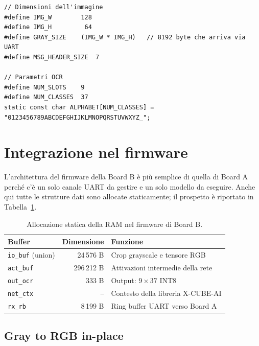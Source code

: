 \begin{lstlisting}[style=stileC, caption={Alfabeto del modello OCR.}, label={lst:alphabet}]
// Dimensioni dell'immagine
#define IMG_W        128
#define IMG_H         64
#define GRAY_SIZE    (IMG_W * IMG_H)   // 8192 byte che arriva via UART
#define MSG_HEADER_SIZE  7

// Parametri OCR
#define NUM_SLOTS    9     
#define NUM_CLASSES  37   
static const char ALPHABET[NUM_CLASSES] = "0123456789ABCDEFGHIJKLMNOPQRSTUVWXYZ_";
\end{lstlisting}

\section{Integrazione nel firmware}
\label{sec:firmware-B}

L'architettura del firmware della Board B è più semplice di quella di Board A perché c'è un solo canale UART da gestire e un solo modello da eseguire. Anche qui tutte le strutture dati sono allocate staticamente; il prospetto è riportato in Tabella~\ref{tab:buffer-B}.

\begin{table}[H]
    \centering
    \caption{Allocazione statica della RAM nel firmware di Board B.}
    \label{tab:buffer-B}
    \begin{tabular}{lrl}
        \toprule
        \textbf{Buffer} & \textbf{Dimensione} & \textbf{Funzione} \\
        \midrule
        \texttt{io\_buf} (union)   & 24\,576 B   & Crop grayscale e tensore RGB \\
        \texttt{act\_buf}          & 296\,212 B  & Attivazioni intermedie della rete \\
        \texttt{out\_ocr}          & 333 B       & Output: $9 \times 37$ INT8 \\
        \texttt{net\_ctx}          & --          & Contesto della libreria X-CUBE-AI \\
        \texttt{rx\_rb}            & 8\,199 B    & Ring buffer UART verso Board A \\
        \bottomrule
    \end{tabular}
\end{table}

\subsection{Gray to RGB in-place}
\label{sec:rgb-expansion}


